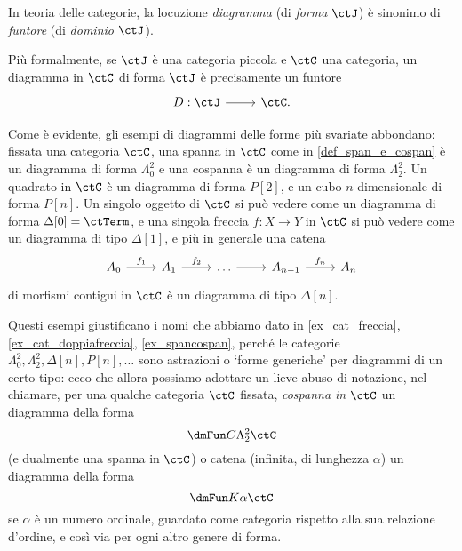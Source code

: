 \begin{example}
\end{example}
\begin{example}
\end{example}
\begin{example}
\end{example}
\begin{definition}\label{def_diagramma_comm}
	In teoria delle categorie, la locuzione \emph{diagramma} (di \emph{forma} \(\ctJ\)) è sinonimo di \emph{funtore} (di \emph{dominio} \(\ctJ\)).

	Più formalmente, se \(\ctJ\) è una categoria piccola e \(\ctC\) una categoria, un diagramma in \(\ctC\) di forma \(\ctJ\) è precisamente un funtore
	\[\begin{tikzcd}
			D : \ctJ \ar[r] & \ctC.
		\end{tikzcd}
	\]
\end{definition}
\begin{remark}
	Come è evidente, gli esempi di diagrammi delle forme più svariate abbondano: fissata una categoria \(\ctC\), una spanna in \(\ctC\) come in \ref{def_span_e_cospan} è un diagramma di forma \(\Lambda^2_0\) e una cospanna è un diagramma di forma \(\Lambda^2_2\). Un quadrato in \(\ctC\) è un diagramma di forma \(P[2]\), e un cubo \(n\)-dimensionale di forma \(P[n]\). Un singolo oggetto di \(\ctC\) si può vedere come un diagramma di forma \(\Delta[0]=\ctTerm\), e una singola freccia \(f : X\to Y\) in \(\ctC\) si può vedere come un diagramma di tipo \(\Delta[1]\), e più in generale una catena
	\[\begin{tikzcd}
			A_0 \ar[r, "f_1"] & A_1 \ar[r, "f_2"] & \dots \ar[r] & A_{n-1} \ar[r, "f_n"] & A_n
		\end{tikzcd}
	\]
	di morfismi contigui in \(\ctC\) è un diagramma di tipo \(\Delta[n]\).

	Questi esempi giustificano i nomi che abbiamo dato in \ref{ex_cat_freccia}, \ref{ex_cat_doppiafreccia}, \ref{ex_spancospan}, perché le categorie \(\Lambda^2_0,\Lambda^2_2,\Delta[n], P[n], \dots\)  sono astrazioni o `forme generiche' per diagrammi di un certo tipo: ecco che allora possiamo adottare un lieve abuso di notazione, nel chiamare, per una qualche categoria $\ctC$ fissata, \emph{cospanna in $\ctC$} un diagramma della forma 
	\[\dmFun C{\Lambda^2_2}\ctC\]
	(e dualmente una spanna in $\ctC$) o catena (infinita, di lunghezza $\alpha$) un diagramma della forma 
	\[\dmFun K\alpha\ctC\]
	se $\alpha$ è un numero ordinale, guardato come categoria rispetto alla sua relazione d'ordine, e così via per ogni altro genere di forma.
\end{remark}
